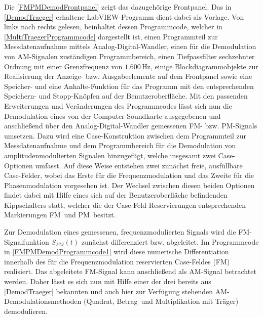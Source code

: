 \documentclass[
a4paper,
12pt,
pagesize,
ngerman
]{scrartcl}
\begin{document}
	\noindent Die \cref{FMPMDemodFrontpanel} zeigt das dazugehörige Frontpanel.
	Das in \cref{DemodTraeger} erhaltene LabVIEW-Programm dient dabei als Vorlage. 
	Von links nach rechts gelesen, beinhaltet dessen Programmcode, welcher in \cref{MultiTraegerProgrammcode} dargestellt ist, einen Programmteil zur Messdatenaufnahme mittels Analog-Digital-Wandler, einen für die Demodulation von AM-Signalen zuständigen Programmbereich, einen Tiefpassfilter sechzehnter Ordnung mit einer Grenzfrequenz von $1.600\,$Hz, einige Blockdiagrammobjekte zur Realisierung der Anzeige- bzw. Ausgabeelemente auf dem Frontpanel sowie eine Speicher- und eine Anhalte-Funktion für das Programm mit den entsprechenden \glqq Speichern\grqq - und \glqq Stopp\grqq -Knöpfen auf der Benutzeroberfläche.
	Mit den passenden Erweiterungen und Veränderungen des Programmcodes lässt sich nun die Demodulation eines von der Computer-Soundkarte ausgegebenen und anschließend über den Analog-Digital-Wandler gemessenen FM- bzw. PM-Signals umsetzen. 
	Dazu wird eine Case-Konstruktion zwischen dem Programmteil zur Messdatenaufnahme und dem Programmbereich für die Demodulation von amplitudenmodulierten Signalen hinzugefügt, welche insgesamt zwei Case-Optionen umfasst.
	Auf diese Weise entstehen zwei zunächst freie, ausfüllbare Case-Felder, wobei das Erste für die Frequenzmodulation und das Zweite für die Phasenmodulation vorgesehen ist.
	Der Wechsel zwischen diesen beiden Optionen findet dabei mit Hilfe eines sich auf der Benutzeroberfläche befindenden Kippschalters statt, welcher die der Case-Feld-Reservierungen entsprechenden Markierungen \glqq FM\grqq\ und \glqq PM\grqq\ besitzt.
	
	Zur Demodulation eines gemessenen, frequenzmodulierten Signals wird die FM-Signalfunktion $S_{FM}(t)$ zunächst differenziert bzw. abgeleitet.
	Im Programmcode in \cref{FMPMDemodProgrammcode1} wird diese numerische Differentiation innerhalb des für die Frequenzmodulation reservierten Case-Feldes (\glqq FM\grqq ) realisiert.
	Das abgeleitete FM-Signal kann anschließend als AM-Signal betrachtet werden.
	Daher lässt es sich nun mit Hilfe einer der drei bereits aus \cref{DemodTraeger} bekannten und auch hier zur Verfügung stehenden AM-Demodulationsmethoden (\glqq Quadrat\grqq , \glqq Betrag\grqq\ und \glqq Multiplikation mit Träger\grqq ) demodulieren.
	
\end{document}
